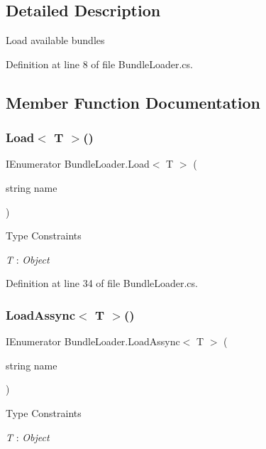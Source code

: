\subsection{Detailed Description}
Load available bundles 



Definition at line 8 of file Bundle\+Loader.\+cs.



\subsection{Member Function Documentation}
\mbox{\label{class_bundle_loader_aa0e96629011c09b778ab9ca4595a32b6}} 
\subsubsection{Load$<$ T $>$()}
{\footnotesize\ttfamily I\+Enumerator Bundle\+Loader.\+Load$<$ T $>$ (\begin{DoxyParamCaption}\item[{string}]{name }\end{DoxyParamCaption})}

\begin{Desc}
\item[Type Constraints]\begin{description}
\item[{\em T} : {\em Object}]\end{description}
\end{Desc}


Definition at line 34 of file Bundle\+Loader.\+cs.

\mbox{\label{class_bundle_loader_a522ba4bb08de1b9d072c55aea54fc471}} 
\subsubsection{Load\+Assync$<$ T $>$()}
{\footnotesize\ttfamily I\+Enumerator Bundle\+Loader.\+Load\+Assync$<$ T $>$ (\begin{DoxyParamCaption}\item[{string}]{name }\end{DoxyParamCaption})}

\begin{Desc}
\item[Type Constraints]\begin{description}
\item[{\em T} : {\em Object}]\end{description}
\end{Desc}


